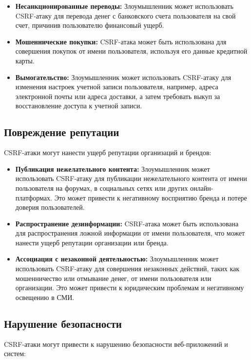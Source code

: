 \documentclass[a4paper,12pt]{diplom}
\begin{document}
	 \begin{itemize}
	 	\item \textbf{Несанкционированные переводы:}  Злоумышленник может использовать CSRF-атаку для перевода денег с банковского счета пользователя на свой счет, причинив пользователю финансовый ущерб.
	 	\item \textbf{Мошеннические покупки:}  CSRF-атака может быть использована для совершения покупок от имени пользователя, используя его данные кредитной карты.
	 	\item \textbf{Вымогательство:}  Злоумышленник может использовать CSRF-атаку для изменения настроек учетной записи пользователя, например, адреса электронной почты или адреса доставки, а затем требовать выкуп за восстановление доступа к учетной записи.
	 \end{itemize}
	 
	 \subsection{Повреждение репутации}
	 
	 CSRF-атаки могут нанести ущерб репутации организаций и брендов:
	 
	 \begin{itemize}
	 	\item \textbf{Публикация нежелательного контента:}  Злоумышленник может использовать CSRF-атаку для публикации нежелательного контента от имени пользователя на форумах, в социальных сетях или других онлайн-платформах.  Это может привести к негативному восприятию бренда и потере доверия пользователей. 
	 	\item \textbf{Распространение дезинформации:}  CSRF-атака может быть использована для распространения ложной информации от имени пользователя, что может нанести ущерб репутации организации или бренда. 
	 	\item \textbf{Ассоциация с незаконной деятельностью:}  Злоумышленник может использовать CSRF-атаку для совершения незаконных действий, таких как мошенничество или отмывание денег, от имени пользователя или организации.  Это может привести к юридическим проблемам и негативному освещению в СМИ.
	 \end{itemize}
	 
	 \subsection{Нарушение безопасности}
	 
	 CSRF-атаки могут привести к нарушению безопасности веб-приложений и систем:
	 
\end{document}
